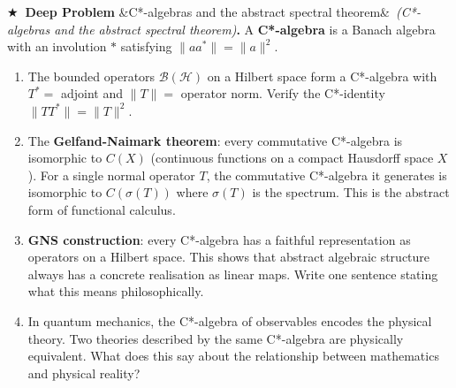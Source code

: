 \documentclass[12pt,a4paper]{article}
\newcounter{problem}
\newcounter{deepproblem}
\newenvironment{deepproblem}[1][]{\refstepcounter{deepproblem}\par\vspace{6pt}\noindent\textbf{\color{NavyBlue}$\bigstar$\ Deep Problem \thedeepproblem}\ifx&#1&\else\ \textit{(#1)}\fi\textbf{.}\enskip}{\par\vspace{4pt}}
\begin{document}
\begin{deepproblem}[C*-algebras and the abstract spectral theorem]
A \textbf{C*-algebra} is a Banach algebra with an involution $*$ satisfying $\|aa^*\|=\|a\|^2$.
\begin{enumerate}[label=(\alph*)]
  \item The bounded operators $\mathcal{B}(\mathcal{H})$ on a Hilbert space form a C*-algebra with $T^* = $ adjoint and $\|T\| = $ operator norm. Verify the C*-identity $\|TT^*\|=\|T\|^2$.
  \item The \textbf{Gelfand-Naimark theorem}: every commutative C*-algebra is isomorphic to $C(X)$ (continuous functions on a compact Hausdorff space $X$). For a single normal operator $T$, the commutative C*-algebra it generates is isomorphic to $C(\sigma(T))$ where $\sigma(T)$ is the spectrum. This is the abstract form of functional calculus.
  \item \textbf{GNS construction}: every C*-algebra has a faithful representation as operators on a Hilbert space. This shows that abstract algebraic structure always has a concrete realisation as linear maps. Write one sentence stating what this means philosophically.
  \item In quantum mechanics, the C*-algebra of observables encodes the physical theory. Two theories described by the same C*-algebra are physically equivalent. What does this say about the relationship between mathematics and physical reality?
\end{enumerate}
\end{deepproblem}
\end{document}
